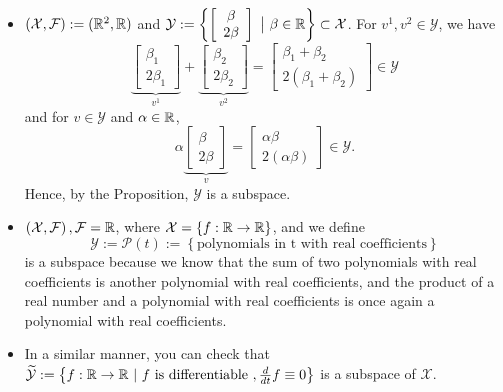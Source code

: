 \begin{example} \mbox{ }
\begin{itemize}
    \item  $\left(\mathcal{X},\mathcal{F}\right) := (\mathbb R^2, \mathbb R)$ and $\mathcal{Y} := \left\{ \left[ \begin{array}{c} \beta\\ 2 \beta \end{array} \right] ~ \big|~ \beta \in \mathbb R \right\}\subset \mathcal{X}$. For $v^1, v^2 \in \mathcal{Y}$, we have
    $$ \underbrace{\left[ \begin{array}{c} \beta_1\\ 2 \beta _1\end{array} \right]}_{v^1} +  \underbrace{\left[ \begin{array}{c} \beta_2\\ 2 \beta_2 \end{array} \right]}_{v^2} =  \left[ \begin{array}{c} \beta_1 + \beta_2\\ 2 (\beta_1 + \beta_2) \end{array} \right] \in \mathcal{Y} $$
    and for  $v \in \mathcal{Y}$ and $\alpha \in \mathbb R$,
    $$ \alpha \underbrace{\left[ \begin{array}{c} \beta\\ 2 \beta\end{array} \right]}_{v} =\left[ \begin{array}{c} \alpha  \beta\\ 2 (\alpha  \beta) \end{array} \right] \in \mathcal{Y} .
    $$
    Hence, by the Proposition, $\mathcal{Y}$ is a subspace.
    
    \item $\left(\mathcal{X},\mathcal{F}\right), \mathcal{F} = \mathbb R$, where $\mathcal{X} = \left\{f: \mathbb R \to \mathbb R\right\}$, and we define 
    $$\mathcal{Y}:= \mathcal{P}(t):=\left\{ \mbox{polynomials in t with real coefficients} \right\}$$
is a subspace because we know that the sum of two polynomials with real coefficients is another polynomial with real coefficients, and the product of a real number and a polynomial with real coefficients is once again a polynomial with real coefficients. \\

\item In a similar manner, you can check that  $ \widetilde{\mathcal{Y}} := \left\{ f: \mathbb R \to \mathbb R ~|~ f \text{ is differentiable }, \frac{d}{dt}f \equiv 0 \right\}$ is a subspace of $\mathcal{X}$.
\end{itemize}
    
\end{example}

